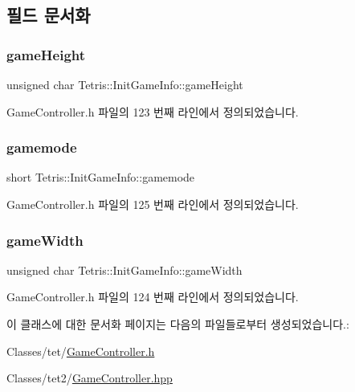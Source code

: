 \subsection{필드 문서화}
\mbox{\label{class_tetris_1_1_init_game_info_a4b0520a703e20bf84077c2d9706a0ef2}} 
\subsubsection{\texorpdfstring{game\+Height}{gameHeight}}
{\footnotesize\ttfamily unsigned char Tetris\+::\+Init\+Game\+Info\+::game\+Height}



Game\+Controller.\+h 파일의 123 번째 라인에서 정의되었습니다.

\mbox{\label{class_tetris_1_1_init_game_info_a5d4655981462fd53da508dfba0d2e99c}} 
\subsubsection{\texorpdfstring{gamemode}{gamemode}}
{\footnotesize\ttfamily short Tetris\+::\+Init\+Game\+Info\+::gamemode}



Game\+Controller.\+h 파일의 125 번째 라인에서 정의되었습니다.

\mbox{\label{class_tetris_1_1_init_game_info_a035e9d0d8d8b92436b2683627ca51059}} 
\subsubsection{\texorpdfstring{game\+Width}{gameWidth}}
{\footnotesize\ttfamily unsigned char Tetris\+::\+Init\+Game\+Info\+::game\+Width}



Game\+Controller.\+h 파일의 124 번째 라인에서 정의되었습니다.



이 클래스에 대한 문서화 페이지는 다음의 파일들로부터 생성되었습니다.\+:\begin{DoxyCompactItemize}
\item 
Classes/tet/\hyperlink{_game_controller_8h}{Game\+Controller.\+h}\item 
Classes/tet2/\hyperlink{_game_controller_8hpp}{Game\+Controller.\+hpp}\end{DoxyCompactItemize}
